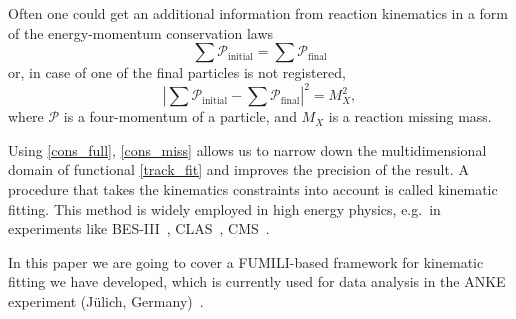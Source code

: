 Often one could get an additional information from reaction kinematics in a form of the energy-momentum conservation laws
\begin{equation}
\label{cons_full}
\sum\mathcal{P}_\mathrm{initial} = \sum\mathcal{P}_\mathrm{final}
\end{equation}
or, in case of one of the final particles is not registered,
\begin{equation}
\label{cons_miss}
\displaystyle\left|\sum\mathcal{P}_\mathrm{initial} - \sum\mathcal{P}_\mathrm{final}\right|^2 = M_X^2,
\end{equation}
where $\mathcal{P}$ is a four-momentum of a particle, and $M_X$ is a reaction missing mass.

Using \eqref{cons_full}, \eqref{cons_miss} allows us to narrow down the multidimensional domain of functional \eqref{track_fit} 
and improves the precision of the result.
A procedure that takes the kinematics constraints into account is called kinematic fitting.
This method is widely employed in high energy physics, e.g.\ in experiments like 
BES-III~\cite{BESIII}, %
CLAS~\cite{CLAS}, %
CMS~\cite{CMS}. %

In this paper we are going to cover a FUMILI-based framework for kinematic fitting we have developed, which is currently used for data analysis in the ANKE experiment (Jülich, Germany)~\cite{anke}.
